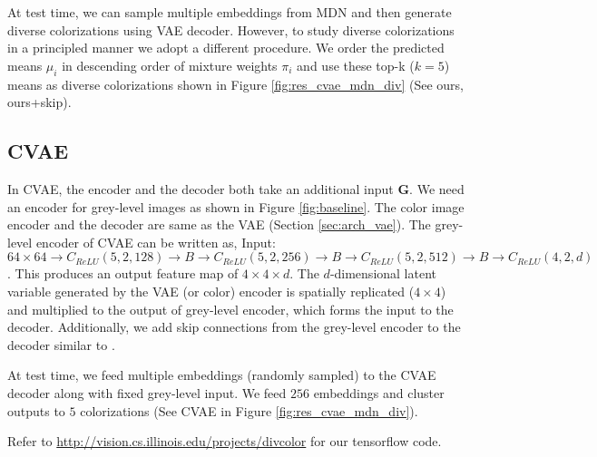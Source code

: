 \documentclass[10pt,twocolumn,letterpaper]{article}
\begin{document}
At test time, we can sample multiple embeddings from MDN and then generate diverse 
colorizations using VAE decoder. However, to study diverse colorizations in a principled 
manner we adopt a different procedure. We order the predicted means $\mu_i$ in descending 
order of mixture weights $\pi_i$ and use these top-k ($k=5$) means as diverse colorizations
shown in Figure \ref{fig:res_cvae_mdn_div} (See ours, ours+skip).

\subsection{CVAE}\label{sec:arch_cvae}
In CVAE, the encoder and the decoder both take an additional input $\mathbf{G}$. 
We need an encoder for grey-level images as shown in Figure \ref{fig:baseline}.  The
color image encoder and the decoder are same as the VAE (Section \ref{sec:arch_vae}). The grey-level 
encoder of CVAE can be written as, Input: $64 \times 64 \rightarrow C_{ReLU}(5, 2, 128) \rightarrow B 
\rightarrow C_{ReLU}(5, 2, 256) \rightarrow B \rightarrow C_{ReLU}(5, 2, 512) \rightarrow B 
\rightarrow C_{ReLU}(4, 2, d)$. This produces an output feature map of $4 \times 4 \times d$. 
The $d$-dimensional latent variable generated by the VAE (or color) encoder is spatially 
replicated ($4 \times 4$) and multiplied to the output of grey-level encoder, which forms
the input to the decoder. Additionally, we add skip connections from the grey-level encoder to the 
decoder similar to \cite{Isola}.

At test time, we feed multiple embeddings (randomly sampled) to the CVAE decoder along with 
fixed grey-level input. We feed $256$ embeddings and 
cluster outputs to $5$ colorizations (See CVAE in Figure \ref{fig:res_cvae_mdn_div}). 

Refer to \url{http://vision.cs.illinois.edu/projects/divcolor} for our tensorflow code.
\end{document}
